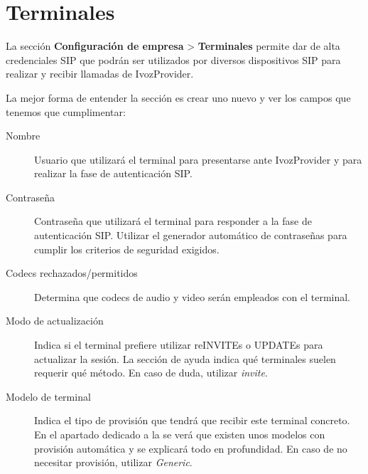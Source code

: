 \documentclass[letterpaper,10pt,spanish]{sphinxmanual}
\begin{document}
\section{Terminales}
\label{pbx_features/terminals:terminals}\label{pbx_features/terminals::doc}\label{pbx_features/terminals:terminals-configuration}
La sección \textbf{Configuración de empresa} \textgreater{} \textbf{Terminales} permite dar de alta credenciales SIP que podrán ser utilizados por diversos dispositivos SIP para realizar y recibir llamadas de IvozProvider.

La mejor forma de entender la sección es crear uno nuevo y ver los campos que tenemos que cumplimentar:

\noindent{}
\begin{description}
\item[{Nombre}] \leavevmode{}\label{pbx_features/terminals:term-name}
Usuario que utilizará el terminal para presentarse ante IvozProvider y para realizar la fase de autenticación SIP.

\item[{Contraseña}] \leavevmode{}\label{pbx_features/terminals:term-password}
Contraseña que utilizará el terminal para responder a la fase de autenticación SIP. Utilizar el generador automático de contraseñas para cumplir los criterios de seguridad exigidos.

\item[{Codecs rechazados/permitidos}] \leavevmode{}\label{pbx_features/terminals:term-allowed-disallowed-codecs}
Determina que codecs de audio y video serán empleados con el terminal.

\item[{Modo de actualización}] \leavevmode{}\label{pbx_features/terminals:term-callerid-update-method}
Indica si el terminal prefiere utilizar reINVITEs o UPDATEs para actualizar la sesión. La sección de ayuda indica qué terminales suelen requerir qué método. En caso de duda, utilizar \emph{invite}.

\item[{Modelo de terminal}] \leavevmode{}\label{pbx_features/terminals:term-terminal-model}
Indica el tipo de provisión que tendrá que recibir este terminal concreto. En el apartado dedicado a la {\hyperref[provisioning/index:provisioning]{}} se verá que existen unos modelos con provisión automática y se explicará todo en profundidad. En caso de no necesitar provisión, utilizar \emph{Generic}.


\end{description}
\end{document}
